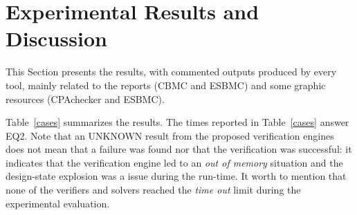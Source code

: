 
\section{Experimental Results and Discussion}
\label{sec:results_indeed}

This Section presents the results, with commented outputs produced by every tool, mainly related to the reports (CBMC and ESBMC) and some graphic resources (CPAchecker and ESBMC).

%
Table~\ref{cases} summarizes the results. The times reported in Table~\ref{cases} answer EQ2. 
Note that an UNKNOWN result from the proposed verification engines does not mean that a failure was found nor that the verification was successful: it indicates that the verification engine led to an \textit{out of memory} situation and the design-state explosion was a issue during the run-time. It worth to mention that none of the verifiers and solvers reached the \textit{time out} limit during the experimental evaluation.

